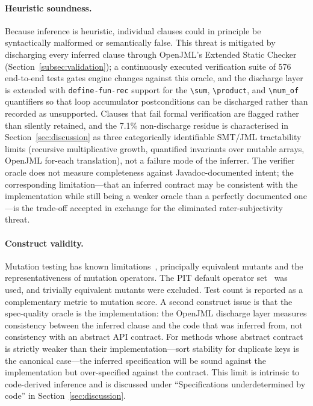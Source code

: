 \paragraph{Heuristic soundness.} Because inference is heuristic, individual clauses could in principle be syntactically malformed or semantically false. This threat is mitigated by discharging every inferred clause through OpenJML's Extended Static Checker (Section~\ref{subsec:validation}); a continuously executed verification suite of 576 end-to-end tests gates engine changes against this oracle, and the discharge layer is extended with \texttt{define-fun-rec} support for the \texttt{\textbackslash sum}, \texttt{\textbackslash product}, and \texttt{\textbackslash num\_of} quantifiers so that loop accumulator postconditions can be discharged rather than recorded as unsupported. Clauses that fail formal verification are flagged rather than silently retained, and the 7.1\% non-discharge residue is characterised in Section~\ref{sec:discussion} as three categorically identifiable SMT/JML tractability limits (recursive multiplicative growth, quantified invariants over mutable arrays, OpenJML for-each translation), not a failure mode of the inferrer. The verifier oracle does not measure completeness against Javadoc-documented intent; the corresponding limitation---that an inferred contract may be consistent with the implementation while still being a weaker oracle than a perfectly documented one---is the trade-off accepted in exchange for the eliminated rater-subjectivity threat.

\paragraph{Construct validity.} Mutation testing has known limitations~\cite{papadakis2019mutation}, principally equivalent mutants and the representativeness of mutation operators. The PIT default operator set~\cite{coles2016pitest} was used, and trivially equivalent mutants were excluded. Test count is reported as a complementary metric to mutation score. A second construct issue is that the spec-quality oracle is the implementation: the OpenJML discharge layer measures consistency between the inferred clause and the code that was inferred from, not consistency with an abstract API contract. For methods whose abstract contract is strictly weaker than their implementation---sort stability for duplicate keys is the canonical case---the inferred specification will be sound against the implementation but over-specified against the contract. This limit is intrinsic to code-derived inference and is discussed under ``Specifications underdetermined by code'' in Section~\ref{sec:discussion}.

